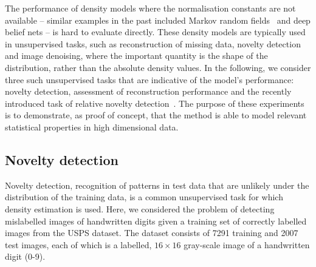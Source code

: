 \documentclass[twoside]{article}
\begin{document}
The performance of density models where the normalisation constants are not available -- similar examples in the past included Markov random fields~\cite{Haluk1987} and deep belief nets -- is hard to evaluate directly. These density models are typically used in unsupervised tasks, such as reconstruction of missing data, novelty detection and image denoising, where the important quantity is the shape of the distribution, rather than the absolute density values.  In the following, we consider three such unsupervised tasks that are indicative of the model's performance: novelty detection, assessment of reconstruction performance and the recently introduced task of relative novelty detection~\cite{Smola2009}. The purpose of these experiments is to demonstrate, as proof of concept, that the method is able to model relevant statistical properties in high dimensional data.

\subsection{Novelty detection}

Novelty detection, recognition of patterns in test data that are unlikely under the distribution of the training data, is a common unsupervised task for which density estimation is used. Here, we considered the problem of detecting mislabelled images of handwritten digits given a training set of correctly labelled images from the USPS dataset. The dataset consists of 7291 training and 2007 test images, each of which is a labelled, $16\times 16$ gray-scale image of a handwritten digit (0-9).
\end{document}
